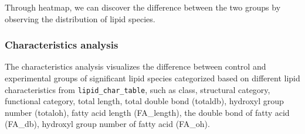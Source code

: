 \documentclass[]{article}
\newcommand{\hlcom}[1]{\textcolor[rgb]{0.502,0.502,0.502}{\textit{#1}}}%
\newcommand{\hlopt}[1]{\textcolor[rgb]{0,0,0}{#1}}%
\newcommand{\hlstd}[1]{\textcolor[rgb]{0.251,0.251,0.251}{#1}}%
\newenvironment{Shaded}{\begin{myshaded}}{\end{myshaded}}
\newcommand{\CommentTok}[1]{\hlcom{#1}}
\newcommand{\OperatorTok}[1]{\hlopt{#1}}
\newcommand{\NormalTok}[1]{\hlstd{#1}}
\begin{document}
\begin{Shaded}
\end{Shaded}

\begin{Shaded}
\end{Shaded}

Through heatmap, we can discover the difference between the two groups by observing the distribution of lipid species.

\hypertarget{speciesChar}{%
\subsubsection{Characteristics analysis}\label{speciesChar}}

The characteristics analysis visualizes the difference between control and experimental groups of significant lipid species categorized based on different lipid characteristics from \texttt{lipid\_char\_table}, such as class, structural category, functional category, total length, total double bond (totaldb), hydroxyl group number (totaloh), fatty acid length (FA\_length), the double bond of fatty acid (FA\_db), hydroxyl group number of fatty acid (FA\_oh).
\end{document}
